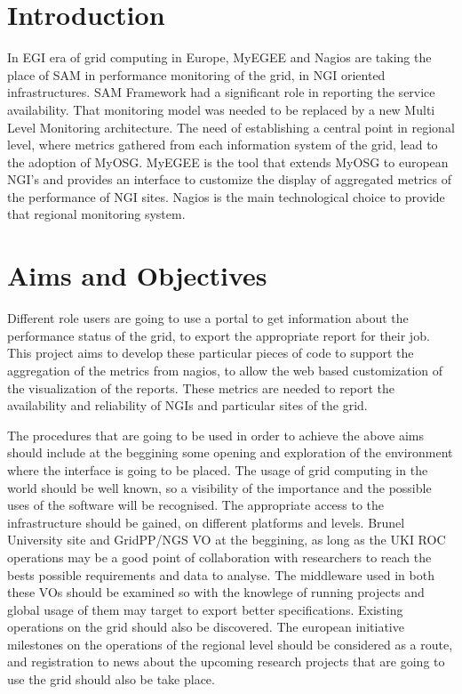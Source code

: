 \section{Introduction}

In EGI era of grid computing in Europe, MyEGEE and Nagios are taking the place
of SAM in performance monitoring of the grid, in NGI oriented infrastructures.
SAM Framework had a significant role in reporting the service availability.
That monitoring model was needed to be replaced by a new Multi Level Monitoring
architecture. The need of establishing a central point in regional level, where
metrics gathered from each information system of the grid, lead to the adoption
of MyOSG. MyEGEE is the tool that extends MyOSG to european NGI's and provides
an interface to customize the display of aggregated metrics of the performance
of NGI sites. Nagios is the main technological choice to provide that regional
monitoring system.

\section{Aims and Objectives}

Different role users are going to use a portal to get information about the
performance status of the grid, to export the appropriate report for their job.
This project aims to develop these particular pieces of code to support the 
aggregation of the metrics from nagios, to allow the web based customization of
the visualization of the reports. These metrics are needed to report the
availability and reliability of NGIs and particular sites of the grid.

The procedures that are going to be used in order to achieve the above aims
should include at the beggining some opening and exploration of the environment
where the interface is going to be placed. The usage of grid computing in
the world should be well known, so a visibility of the importance and the
possible uses of the software will be recognised. The appropriate
access to the infrastructure should be gained, on different platforms and levels.
Brunel University site and GridPP/NGS VO at the beggining, as long as the UKI
ROC operations may be a good point of collaboration with researchers to reach
the bests possible requirements and data to analyse. The middleware used in
both these VOs should be examined so with the knowlege of running projects and
global usage of them may target to export better specifications. Existing
operations on the grid should also be discovered. The european initiative
milestones on the operations of the regional level should be considered as a
route, and registration to news about the upcoming research projects that
are going to use the grid should also be take place.


